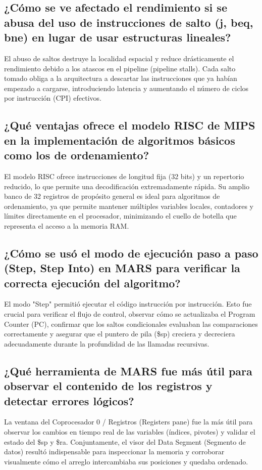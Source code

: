 \documentclass[12pt, a4paper]{article}
\begin{document}
\subsection{¿Cómo se ve afectado el rendimiento si se abusa del uso de instrucciones de salto (j, beq, bne) en lugar de usar estructuras lineales?}
    El abuso de saltos destruye la localidad espacial y reduce drásticamente el rendimiento debido a los atascos en el pipeline (pipeline stalls). Cada salto tomado obliga a la arquitectura a descartar las instrucciones que ya habían empezado a cargarse, introduciendo latencia y aumentando el número de ciclos por instrucción (CPI) efectivos.

\subsection{¿Qué ventajas ofrece el modelo RISC de MIPS en la implementación de algoritmos básicos como los de ordenamiento?}
    El modelo RISC ofrece instrucciones de longitud fija (32 bits) y un repertorio reducido, lo que permite una decodificación extremadamente rápida. Su amplio banco de 32 registros de propósito general es ideal para algoritmos de ordenamiento, ya que permite mantener múltiples variables locales, contadores y límites directamente en el procesador, minimizando el cuello de botella que representa el acceso a la memoria RAM.

\subsection{¿Cómo se usó el modo de ejecución paso a paso (Step, Step Into) en MARS para verificar la correcta ejecución del algoritmo?}
    El modo "Step" permitió ejecutar el código instrucción por instrucción. Esto fue crucial para verificar el flujo de control, observar cómo se actualizaba el Program Counter (PC), confirmar que los saltos condicionales evaluaban las comparaciones correctamente y asegurar que el puntero de pila (\$sp) creciera y decreciera adecuadamente durante la profundidad de las llamadas recursivas.

\subsection{¿Qué herramienta de MARS fue más útil para observar el contenido de los registros y detectar errores lógicos?}
    La ventana del Coprocesador 0 / Registros (Registers pane) fue la más útil para observar los cambios en tiempo real de las variables (índices, pivotes) y validar el estado del \$sp y \$ra. Conjuntamente, el visor del Data Segment (Segmento de datos) resultó indispensable para inspeccionar la memoria y corroborar visualmente cómo el arreglo intercambiaba sus posiciones y quedaba ordenado.
\end{document}
